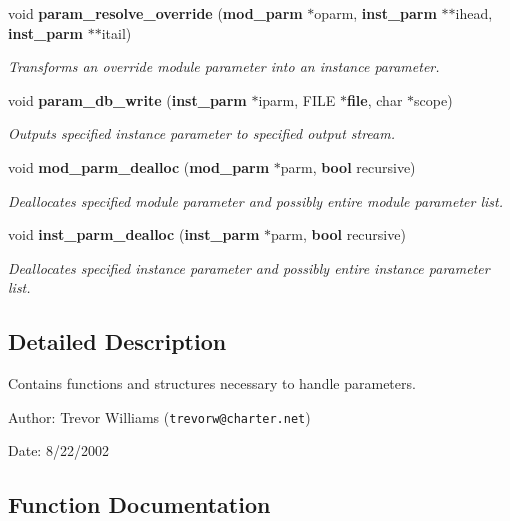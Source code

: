 \begin{CompactItemize}
void {\bf param\_\-resolve\_\-override} ({\bf mod\_\-parm} $\ast$oparm, {\bf inst\_\-parm} $\ast$$\ast$ihead, {\bf inst\_\-parm} $\ast$$\ast$itail)
\begin{CompactList}\small\item\em Transforms an override module parameter into an instance parameter.\item\end{CompactList}\item 
void {\bf param\_\-db\_\-write} ({\bf inst\_\-parm} $\ast$iparm, FILE $\ast${\bf file}, char $\ast$scope)
\begin{CompactList}\small\item\em Outputs specified instance parameter to specified output stream.\item\end{CompactList}\item 
void {\bf mod\_\-parm\_\-dealloc} ({\bf mod\_\-parm} $\ast$parm, {\bf bool} recursive)
\begin{CompactList}\small\item\em Deallocates specified module parameter and possibly entire module parameter list.\item\end{CompactList}\item 
void {\bf inst\_\-parm\_\-dealloc} ({\bf inst\_\-parm} $\ast$parm, {\bf bool} recursive)
\begin{CompactList}\small\item\em Deallocates specified instance parameter and possibly entire instance parameter list.\item\end{CompactList}\end{CompactItemize}


\subsection{Detailed Description}
Contains functions and structures necessary to handle parameters.

\begin{Desc}
\item[Author:]Trevor Williams ({\tt trevorw@charter.net}) \end{Desc}
\begin{Desc}
\item[Date:]8/22/2002 \end{Desc}


\subsection{Function Documentation}
